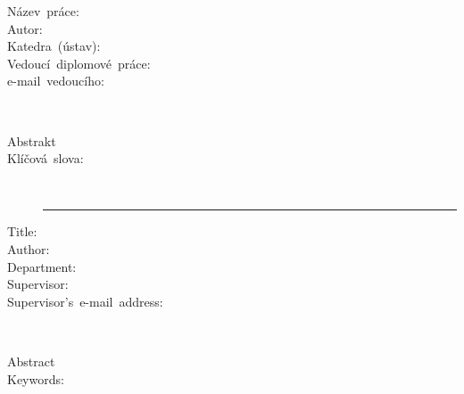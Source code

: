 \documentclass[a4paper,twoside,english,english,openright,cleardoublepage=empty,BCOR10mm,DIV11]{scrreprt}
\newcommand{\lyxline}[1][1pt]{%
  \par\noindent%
  \rule[.5ex]{\linewidth}{#1}\par}
\begin{document}
{\small \thispagestyle{plain} }{\small \par}

\noindent {\small ~\vfill{}
}{\small \par}

\begin{description}
\item [{{\small Název~práce:}}] \noindent {\small \TitleCs}{\small \par}
\item [{{\small Autor:}}] \noindent {\small \AuthorName}{\small \par}
\item [{{\small Katedra~(ústav):}}] \noindent {\small \DepartmentCs}{\small \par}
\item [{{\small Vedoucí~diplomové~práce:}}] \noindent {\small \SupervisorName}
\item [{{\small e-mail~vedoucího:}}] \noindent {\small \SupervisorEmail}\\
{\small \par}
\item [{{\small Abstrakt}}] \noindent {\small  }{\small \par}
\item [{{\small Klíčová~slova:}}] \noindent {\small \KeywordsCs}\\
{\small \lyxline{\small}}{\small \par}
\item [{{\small Title:}}] \noindent {\small \Title}{\small \par}
\item [{{\small Author:}}] \noindent {\small \AuthorName}{\small \par}
\item [{{\small Department:}}] \noindent {\small \Department}{\small \par}
\item [{{\small Supervisor:}}] \noindent {\small \SupervisorName}{\small \par}
\item [{{\small Supervisor's~e-mail~address:}}] \noindent {\small \SupervisorEmail}\\
{\small \par}
\item [{{\small Abstract}}] \noindent {\small  }{\small \par}
\item [{{\small Keywords:}}] \noindent {\small \Keywords}{\small \par}
\end{description}
\cleardoublepage{}\thispagestyle{empty}~{\small {} }{\small \par}
\end{document}
